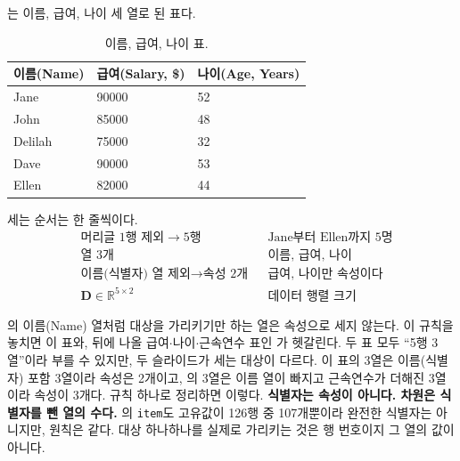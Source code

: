 \begin{example}[이름, 급여, 나이 표를 행렬로 보기]
\label{ex:attr-name-salary-age}
는 이름, 급여, 나이 세 열로 된 표다.

\begin{table}[H]\centering
\caption{이름, 급여, 나이 표.}
\label{tab:attr-name-salary-age}
\begin{tabularx}{0.7\linewidth}{@{}l X X@{}}
\toprule
이름(Name) & 급여(Salary, \$) & 나이(Age, Years) \\
\midrule
Jane    & 90000 & 52 \\
\midrule
John    & 85000 & 48 \\
\midrule
Delilah & 75000 & 32 \\
\midrule
Dave    & 90000 & 53 \\
\midrule
Ellen   & 82000 & 44 \\
\bottomrule
\end{tabularx}
\end{table}

세는 순서는 한 줄씩이다.
\begin{align*}
  &\text{머리글 1행 제외} \to 5\text{행}
    && \text{Jane부터 Ellen까지 5명} \\
  &\text{열 3개}
    && \text{이름, 급여, 나이} \\
  &\text{이름(식별자) 열 제외} \to \text{속성 2개}
    && \text{급여, 나이만 속성이다} \\
  &\mathbf{D} \in \mathbb{R}^{5 \times 2}
    && \text{데이터 행렬 크기}
\end{align*}
\end{example}

\begin{pitfall}
의 이름(Name) 열처럼 대상을 가리키기만
하는 열은 속성으로 세지 않는다. 이 규칙을 놓치면 이 표와, 뒤에 나올
급여$\cdot$나이$\cdot$근속연수 표인 가 헷갈린다.
두 표 모두 ``5행 3열''이라 부를 수 있지만, 두 슬라이드가 세는 대상이
다르다.
이 표의 3열은 이름(식별자) 포함 3열이라 속성은 2개이고,
의 3열은 이름 열이 빠지고 근속연수가 더해진
3열이라 속성이 3개다. 규칙 하나로 정리하면 이렇다. \textbf{식별자는
속성이 아니다. 차원은 식별자를 뺀 열의 수다.} 의
\texttt{item}도 고유값이 126행 중 107개뿐이라 완전한 식별자는 아니지만,
원칙은 같다. 대상 하나하나를 실제로 가리키는 것은 행 번호이지 그 열의
값이 아니다.
\end{pitfall}

